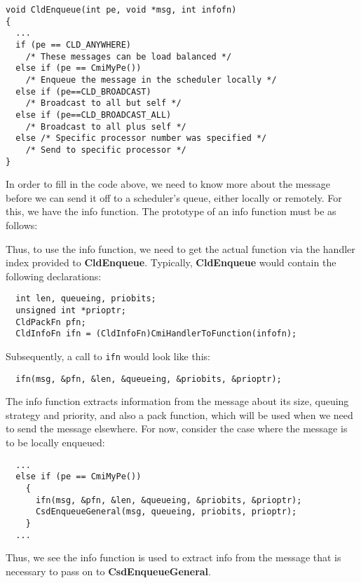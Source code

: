 \begin{verbatim}
void CldEnqueue(int pe, void *msg, int infofn)
{
  ...
  if (pe == CLD_ANYWHERE)
    /* These messages can be load balanced */
  else if (pe == CmiMyPe())
    /* Enqueue the message in the scheduler locally */
  else if (pe==CLD_BROADCAST) 
    /* Broadcast to all but self */
  else if (pe==CLD_BROADCAST_ALL)
    /* Broadcast to all plus self */
  else /* Specific processor number was specified */
    /* Send to specific processor */
}
\end{verbatim}

In order to fill in the code above, we need to know more about the
message before we can send it off to a scheduler's queue, either
locally or remotely.  For this, we have the info function.  The
prototype of an info function must be as follows:


Thus, to use the info function, we need to get the actual function via
the handler index provided to {\bf CldEnqueue}.  Typically, {\bf
CldEnqueue} would contain the following declarations:

\begin{verbatim}
  int len, queueing, priobits; 
  unsigned int *prioptr;
  CldPackFn pfn;
  CldInfoFn ifn = (CldInfoFn)CmiHandlerToFunction(infofn);
\end{verbatim}

\noindent Subsequently, a call to {\tt ifn} would look like this:

\begin{verbatim}
  ifn(msg, &pfn, &len, &queueing, &priobits, &prioptr);
\end{verbatim}

The info function extracts information from the message about its size,
queuing strategy and priority, and also a pack function, which will be
used when we need to send the message elsewhere.  For now, consider
the case where the message is to be locally enqueued:

\begin{verbatim}
  ...
  else if (pe == CmiMyPe())
    {
      ifn(msg, &pfn, &len, &queueing, &priobits, &prioptr);
      CsdEnqueueGeneral(msg, queueing, priobits, prioptr);
    }
  ...
\end{verbatim}

Thus, we see the info function is used to extract info from the
message that is necessary to pass on to {\bf CsdEnqueueGeneral}.

